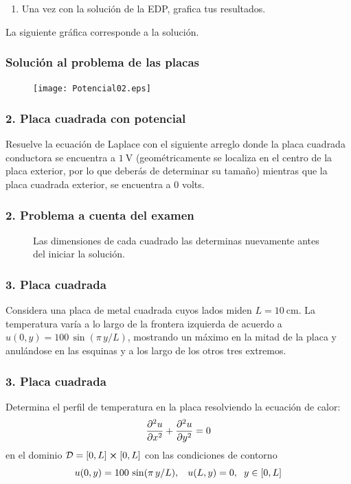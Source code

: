 {\begin{frame}
\begin{enumerate}[<+->]
\item Una vez con la solución de la EDP, grafica tus resultados.
\end{enumerate}
\pause
La siguiente gráfica corresponde a la solución.
\end{frame}
{
\begin{frame}[fragile]
\frametitle{Solución al problema de las placas}
\begin{figure}
	\centering
	\texttt{[image: Potencial02.eps]} 
\end{figure}
\end{frame}
}
\begin{frame}
\frametitle{2. Placa cuadrada con potencial}
Resuelve la ecuación de Laplace con el siguiente arreglo donde la placa cuadrada conductora se encuentra a $\SI{1}{\volt}$ (geométricamente se localiza en el centro de la placa exterior, por lo que deberás de determinar su tamaño) mientras que la placa cuadrada exterior, se encuentra a $0$ volts.
\end{frame}
{
\begin{frame}
\frametitle{2. Problema a cuenta del examen}
\begin{figure}
	\centering
	
	\caption{Las dimensiones de cada cuadrado las determinas nuevamente antes del iniciar la solución.}
\end{figure}
\end{frame}
}
\begin{frame}
\frametitle{3. Placa cuadrada}
Considera una placa de metal cuadrada cuyos lados miden $L = \SI{10}{\centi\metre}$. La temperatura varía a lo largo de la frontera izquierda de acuerdo a $u(0, y) = 100 \, \sin (\pi \, y /L)$, mostrando un máximo en la mitad de la placa y anulándose en las esquinas y a los largo de los otros tres extremos.
\end{frame}
\begin{frame}
\frametitle{3. Placa cuadrada}
Determina el perfil de temperatura en la placa resolviendo la ecuación de calor:
\begin{align}
\pdv[2]{u}{x} + \pdv[2]{u}{y} = 0
\label{eq:ecuacion_13_147}
\end{align}
en el dominio $\mathcal{D} = [0, L] \cp [0, L]$ con las condiciones de contorno
\begin{align}
\begin{aligned}
u(0, y) &= 100 \, \sin (\pi \, y / L), \hspace{0.3cm} u(L, y) = 0, \hspace{0.2cm} y \in [0, L] \\[0.5em]

\end{aligned}
\end{align}
\end{frame}}
